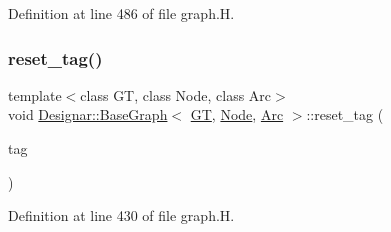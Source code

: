 Definition at line 486 of file graph.\+H.

\mbox{\label{class_designar_1_1_base_graph_ae8845b2eb9d33f62684c8e5acc7c91b7}} 
\subsubsection{\texorpdfstring{reset\+\_\+tag()}{reset\_tag()}}
{\footnotesize\ttfamily template$<$class GT, class Node, class Arc$>$ \\
void \hyperlink{class_designar_1_1_base_graph}{Designar\+::\+Base\+Graph}$<$ \hyperlink{demo-buildgraph_8_c_a3001c40d2c31ca87ed96cd7d1334a55e}{GT}, \hyperlink{namespace_designar_a5af326c65aa2bd26b26c410f2030d09e}{Node}, \hyperlink{namespace_designar_a3f55fb5513d62ff47cbc8f72b8e95d6f}{Arc} $>$\+::reset\+\_\+tag (\begin{DoxyParamCaption}\item[{\hyperlink{namespace_designar_ac91366256ea6ea6ac5fd483d55a7499e}{Graph\+Tag}}]{tag }\end{DoxyParamCaption})\hspace{0.3cm}{\ttfamily [inline]}}



Definition at line 430 of file graph.\+H.

\mbox{\label{class_designar_1_1_base_graph_a4c9703fdb22d4e1d3cf0428fd705b3ee}} 
